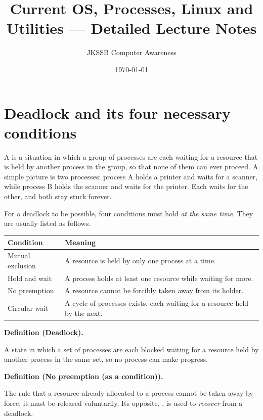 \documentclass[11pt]{article}
\title{Current OS, Processes, Linux and Utilities --- Detailed Lecture Notes}
\author{JKSSB Computer Awareness}
\date{\today}
\newenvironment{definitionbox}[1]{%
  \par\noindent\textbf{Definition (#1).}\ \itshape
}{\par\vspace{0.3em}}
\begin{document}
\maketitle

\section{Deadlock and its four necessary conditions}
A  is a situation in which a group of processes are each waiting
for a resource that is held by another process in the group, so that none of
them can ever proceed. A simple picture is two processes: process A holds a
printer and waits for a scanner, while process B holds the scanner and waits
for the printer. Each waits for the other, and both stay stuck forever.

For a deadlock to be possible, four conditions must hold \emph{at the same
time}. They are usually listed as follows.

\begin{center}
\begin{tabular}{p{}p{}}
\toprule
\textbf{Condition} & \textbf{Meaning} \\
\midrule
Mutual exclusion & A resource is held by only one process at a time. \\
Hold and wait & A process holds at least one resource while waiting for more. \\
No preemption & A resource cannot be forcibly taken away from its holder. \\
Circular wait & A cycle of processes exists, each waiting for a resource held by the next. \\
\bottomrule
\end{tabular}
\end{center}

\begin{definitionbox}{Deadlock}
A state in which a set of processes are each blocked waiting for a resource
held by another process in the same set, so no process can make progress.
\end{definitionbox}

\begin{definitionbox}{No preemption (as a condition)}
The rule that a resource already allocated to a process cannot be taken away
by force; it must be released voluntarily. Its opposite, , is
used to \emph{recover} from a deadlock.
\end{definitionbox}
\end{document}

